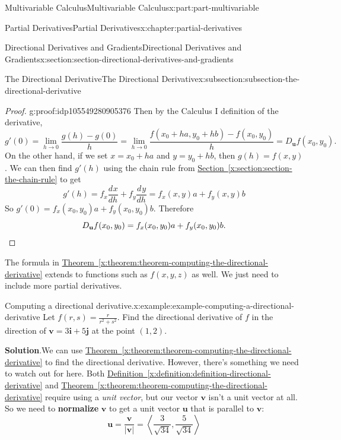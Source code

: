 \documentclass[twoside,10pt,]{book}
\newcommand{\blocktitlefont}{\relax}
\newcommand{\xreffont}{\relax}
\newcommand{\terminology}[1]{\textbf{#1}}
\numberwithin{equation}{part}
\newcommand{\qedhere}{\relax}
\newcommand{\vb}[1]{\mathbf{#1}}
\newcommand{\dv}[3][]{\dfrac{d^{#1} #2}{d #3^{#1}}}
\newcommand{\dotprod}[1]{\left\langle #1 \right\rangle}
\begin{document}
\begin{partptx}{Multivariable Calculus}{}{Multivariable Calculus}{}{}{x:part:part-multivariable}
\begin{chapterptx}{Partial Derivatives}{}{Partial Derivatives}{}{}{x:chapter:partial-derivatives}
\begin{sectionptx}{Directional Derivatives and Gradients}{}{Directional Derivatives and Gradients}{}{}{x:section:section-directional-derivatives-and-gradients}
\begin{subsectionptx}{The Directional Derivative}{}{The Directional Derivative}{}{}{x:subsection:subsection-the-directional-derivative}
\begin{proof}{}{g:proof:idp105549280905376}
Then by the Calculus I definition of the derivative,%
\begin{equation*}
g'(0) = \lim_{h\to0}\frac{g(h) - g(0)}{h} = \lim_{h\to0}\frac{f(x_{0}+ha, y_{0}+hb) - f(x_{0},y_{0})}{h} = D_{\vb{u}}f(x_{0},y_{0}).
\end{equation*}
On the other hand, if we set \(x = x_{0} + ha\) and \(y = y_{0} + hb\), then \(g(h) = f(x,y)\). We can then find \(g'(h)\) using the chain rule from \hyperref[x:section:section-the-chain-rule]{Section~{\xreffont\ref{x:section:section-the-chain-rule}}} to get%
\begin{equation*}
g'(h) = f_{x}\dv{x}{h} + f_{y}\dv{y}{h} = f_{x}(x,y)a + f_{y}(x,y)b
\end{equation*}
So \(g'(0) = f_{x}(x_{0},y_{0})a + f_{y}(x_{0},y_{0})b.\) Therefore%
\begin{equation*}
D_{\vb{u}}f(x_{0},y_{0}) = f_{x}(x_{0},y_{0})a + f_{y}(x_{0},y_{0})b.\qedhere
\end{equation*}
%
\end{proof}
The formula in \hyperref[x:theorem:theorem-computing-the-directional-derivative]{Theorem~{\xreffont\ref{x:theorem:theorem-computing-the-directional-derivative}}} extends to functions such as \(f(x,y,z)\) as well. We just need to include more partial derivatives.%
\begin{example}{Computing a directional derivative.}{x:example:example-computing-a-directional-derivative}%
Let \(f(r,s) = \frac{r}{r^{2}+s^{2}}\). Find the directional derivative of \(f\) in the direction of \(\vb{v} = 3\vb{i} + 5\vb{j}\) at the point \((1,2)\).%
\par\smallskip%
\noindent\textbf{\blocktitlefont Solution}.\hypertarget{g:solution:idp105549280847776}{}\quad{}We can use \hyperref[x:theorem:theorem-computing-the-directional-derivative]{Theorem~{\xreffont\ref{x:theorem:theorem-computing-the-directional-derivative}}} to find the directional derivative. However, there's something we need to watch out for here. Both \hyperref[x:definition:definition-directional-derivative]{Definition~{\xreffont\ref{x:definition:definition-directional-derivative}}} and \hyperref[x:theorem:theorem-computing-the-directional-derivative]{Theorem~{\xreffont\ref{x:theorem:theorem-computing-the-directional-derivative}}} require using a \emph{unit vector}, but our vector \(\vb{v}\) isn't a unit vector at all. So we need to \terminology{normalize} \(\vb{v}\) to get a unit vector \(\vb{u}\) that is parallel to \(\vb{v}\):%
\begin{equation*}
\vb{u} = \frac{\vb{v}}{|\vb{v}|} = \dotprod{\frac{3}{\sqrt{34}}, \frac{5}{\sqrt{34}}}

\end{equation*}
\end{example}
\end{subsectionptx}
\end{sectionptx}
\end{chapterptx}
\end{partptx}
\end{document}

